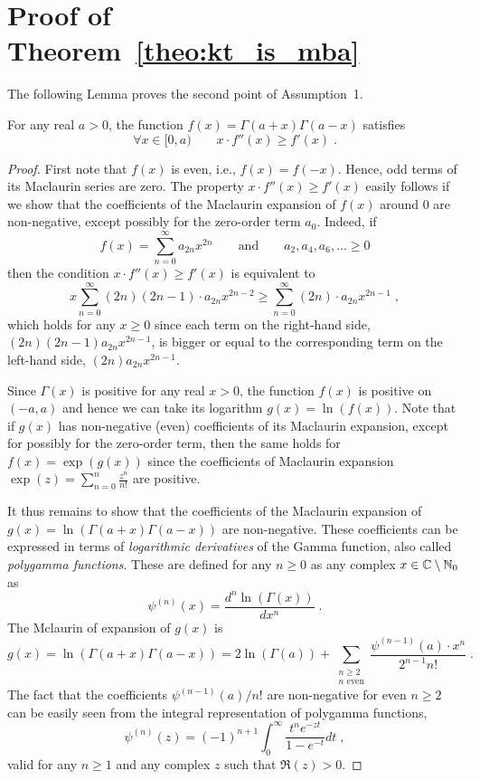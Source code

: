 \section{Proof of Theorem~\ref{theo:kt_is_mba}}

The following Lemma proves the second point of Assumption~1.
\begin{lemma}
\label{lemma:gamma-function}
For any real $a > 0$, the function $f(x) = \Gamma(a+x) \Gamma(a-x)$ satisfies
$$
\forall x \in [0, a) \qquad x \cdot f''(x) \ge f'(x) \; .
$$
\end{lemma}
\begin{proof}
First note that $f(x)$ is even, i.e., $f(x) = f(-x)$. Hence, odd terms of its
Maclaurin series are zero. The property $x \cdot f''(x) \ge f'(x)$ easily
follows if we show that the coefficients of the Maclaurin expansion of $f(x)$
around $0$ are non-negative, except possibly for the zero-order term $a_0$.
Indeed, if
$$
f(x) = \sum_{n=0}^\infty a_{2n} x^{2n} \qquad \text{and} \qquad a_2, a_4, a_6, \dots \ge 0
$$
then the condition $x \cdot f''(x) \ge f'(x)$ is equivalent to
$$
x \sum_{n=0}^\infty (2n)(2n-1) \cdot a_{2n} x^{2n-2} \ge \sum_{n=0}^\infty (2n) \cdot a_{2n} x^{2n-1} \; ,
$$
which holds for any $x \ge 0$ since each term on the right-hand side,
$(2n)(2n-1) a_{2n} x^{2n-1}$, is bigger or equal to the corresponding term on
the left-hand side, $(2n) a_{2n} x^{2n-1}$.

Since $\Gamma(x)$ is positive for any real $x > 0$, the function $f(x)$ is
positive on $(-a,a)$ and hence we can take its logarithm $g(x) = \ln(f(x))$.
Note that if $g(x)$ has non-negative (even) coefficients of its Maclaurin
expansion, except for possibly for the zero-order term, then the same holds for
$f(x) = \exp(g(x))$ since the coefficients of Maclaurin expansion $\exp(z) =
\sum_{n=0}^n \frac{z^n}{n!}$ are positive.

It thus remains to show that the coefficients of the Maclaurin expansion of
$g(x) = \ln(\Gamma(a+x) \Gamma(a-x))$ are non-negative. These coefficients can
be expressed in terms of \emph{logarithmic derivatives} of the Gamma function,
also called \emph{polygamma functions}. These are defined for any $n \ge 0$ as
any complex $x \in \mathbb{C} \setminus \mathbb{N}_{0}$ as
$$
\psi^{(n)}(x) = \frac{d^n\ln(\Gamma(x))}{dx^n} \; .
$$
The Mclaurin of expansion of $g(x)$ is
$$
g(x)
= \ln \left( \Gamma(a+x) \Gamma(a-x) \right)
= 2 \ln(\Gamma(a)) + \sum_{\substack{n \ge 2 \\ \text{$n$ even}}} \frac{\psi^{(n-1)}(a) \cdot x^n}{2^{n-1} n!} \; .
$$
The fact that the coefficients $\psi^{(n-1)}(a)/n!$ are non-negative for even $n
\ge 2$ can be easily seen from the integral representation of polygamma
functions,
$$
\psi^{(n)}(z) = (-1)^{n+1} \int_0^\infty \frac{t^n e^{-zt}}{1-e^{-t}} dt \; ,
$$
valid for any $n \ge 1$ and any complex $z$ such that $\Re(z) > 0$.
\end{proof}

